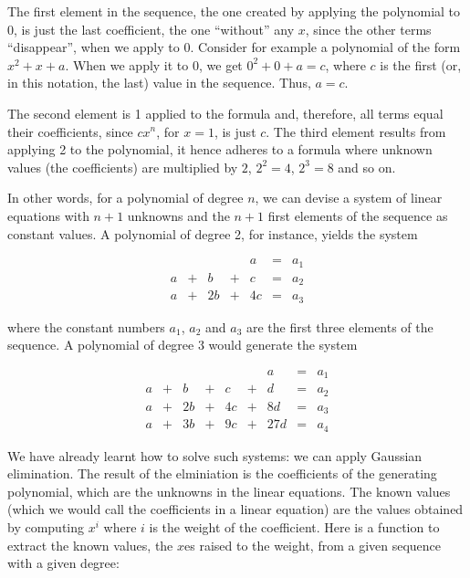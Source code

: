 \documentclass[tikz]{scrreprt}
\begin{document}
The first element in the sequence, the one created by applying
the polynomial to 0, is just the last coefficient,
the one ``without'' any $x$, since the other terms ``disappear'',
when we apply to 0. Consider for example a polynomial of the form
$x^2 + x + a$. When we apply it to 0,
we get $0^2 + 0 + a = c$, where $c$ is the first
(or, in this notation, the last)
value in the sequence. Thus, $a=c$.

The second element is 1 applied to the formula and, therefore,
all terms equal their coefficients, since $cx^n$, for $x=1$, 
is just $c$. The third element results from applying 2 to the polynomial,
it hence adheres to a formula where unknown values (the coefficients)
are multiplied by $2$, $2^2=4$, $2^3=8$ and so on.

In other words, for a polynomial of degree $n$, we can devise
a system of linear equations with $n+1$ unknowns and
the $n+1$ first elements of the sequence as constant values.
A polynomial of degree 2, for instance, yields the system

\begin{equation}
\begin{array}{rcrcrcr}
    &   &    &   & a  & = &  a_1 \\
  a & + & b  & + & c  & = &  a_2 \\
  a & + & 2b & + & 4c & = &  a_3
\end{array}
\end{equation}

where the constant numbers $a_1$, $a_2$ and $a_3$
are the first three elements of the sequence.
A polynomial of degree 3 would generate the system

\begin{equation}
\begin{array}{rcrcrcrcr}
    &   &    &   &    &   &   a & = &  a_1 \\
  a & + &  b & + &  c & + &   d & = &  a_2 \\
  a & + & 2b & + & 4c & + &  8d & = &  a_3 \\
  a & + & 3b & + & 9c & + & 27d & = &  a_4 
\end{array}
\end{equation}

We have already learnt how to solve such systems:
we can apply Gaussian elimination.
The result of the elminiation is 
the coefficients of the generating polynomial,
which are the unknowns in the linear equations.
The known values (which we would call the coefficients
in a linear equation) are the values obtained
by computing $x^i$ where $i$ is the weight 
of the coefficient.
Here is a function to extract the known values,
the $x$es raised to the weight, from a given 
sequence with a given degree:
\end{document}
